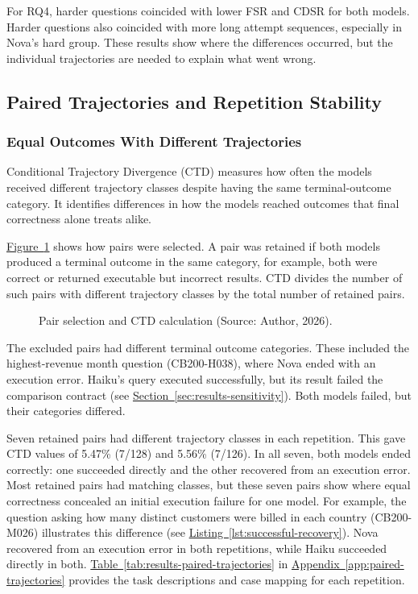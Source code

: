 For RQ4, harder questions coincided with lower FSR and CDSR for both models.
Harder questions also coincided with more long attempt sequences,
especially in Nova's hard group. 
These results show where the differences occurred, but the
individual trajectories are needed to explain what went wrong.

\subsection{Paired Trajectories and Repetition Stability}
\label{sec:results-paired}

\subsubsection{Equal Outcomes With Different Trajectories}

Conditional Trajectory Divergence (CTD) measures how often the models received
different trajectory classes despite having the same terminal-outcome category.
It identifies differences in how the models reached outcomes that final
correctness alone treats alike.

\hyperref[fig:results-ctd-flow]{Figure~\ref*{fig:results-ctd-flow}} shows how pairs
were selected. A pair was retained if both models produced a terminal outcome in the same category, 
for example, both were correct or returned executable but incorrect results. 
CTD divides the number of such pairs with
different trajectory classes by the total number of retained pairs.

\begin{figure}[H]
\centering

\caption{Pair selection and CTD calculation (Source: Author, 2026).}
\label{fig:results-ctd-flow}
\end{figure}

The excluded pairs had different terminal outcome categories. These included
the highest-revenue month question (CB200-H038), where Nova ended with an execution error. 
Haiku's query executed successfully, but its result failed the comparison contract
(see \hyperref[sec:results-sensitivity]{Section~\ref*{sec:results-sensitivity}}).
Both models failed, but their categories differed.

Seven retained pairs had different trajectory classes in each repetition.
This gave CTD values of 5.47\% (7/128) and 5.56\% (7/126).
In all seven, both models ended correctly: one succeeded directly and the other
recovered from an execution error.
Most retained pairs had matching classes, but these seven pairs show where
equal correctness concealed an initial execution failure for one model.
For example, the question asking how many distinct customers were billed in each country
(CB200-M026) illustrates this difference
(see \hyperref[lst:successful-recovery]{Listing~\ref*{lst:successful-recovery}}).
Nova recovered from an execution error in both repetitions,
while Haiku succeeded directly in both.
\hyperref[tab:results-paired-trajectories]{Table~\ref*{tab:results-paired-trajectories}}
in \hyperref[app:paired-trajectories]{Appendix~\ref*{app:paired-trajectories}}
provides the task descriptions and case mapping for each repetition.

